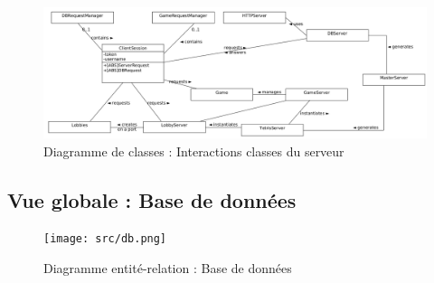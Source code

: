 \documentclass{report}
\begin{document}
\vspace{-1em}

\begin{figure}[H]
    \centering
    \includegraphics[width=\textwidth, keepaspectratio]{src/server_class.png}
    \caption{Diagramme de classes : Interactions classes du serveur}
    \label{fig:classes_server}
\end{figure}

\subsection{Vue globale : Base de données}

\vspace{-1em}

\begin{figure}[H]
    \centering
    \texttt{[image: src/db.png]}
    \caption{Diagramme entité-relation : Base de données}
    \label{fig:entity_relation_database}
\end{figure}
\end{document}
